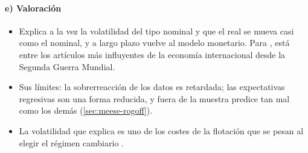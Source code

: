 \documentclass[11pt]{article}
\begin{document}
\paragraph{e) Valoración}
\begin{itemize}
\item Explica a la vez la volatilidad del tipo nominal y que el real se mueva casi como el nominal, y a largo plazo vuelve al modelo monetario. Para \textcite{Rogoff2002Dornbusch}, está entre los artículos más influyentes de la economía internacional desde la Segunda Guerra Mundial.
\item Sus límites: la sobrerreacción de los datos es retardada; las expectativas regresivas son una forma reducida, y fuera de la muestra predice tan mal como los demás (\ref{sec:meese-rogoff}).
\item La volatilidad que explica es uno de los costes de la flotación que se pesan al elegir el régimen cambiario .
\end{itemize}
\end{document}
